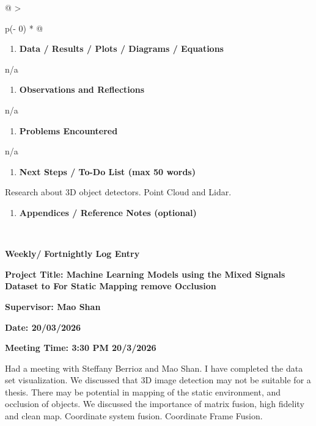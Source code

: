 \begin{longtable}[]{@{}
  >{\raggedright\arraybackslash}p{(\columnwidth - 0\tabcolsep) * }@{}}
\begin{minipage}[b]{\linewidth}
\begin{enumerate}
\def\labelenumi{\arabic{enumi}.}
\setcounter{enumi}{2}
\item
  \textbf{Data / Results / Plots / Diagrams / Equations}
\end{enumerate}

n/a

\begin{enumerate}
\def\labelenumi{\arabic{enumi}.}
\setcounter{enumi}{3}
\item
  \textbf{Observations and Reflections}
\end{enumerate}

n/a

\begin{enumerate}
\def\labelenumi{\arabic{enumi}.}
\setcounter{enumi}{4}
\item
  \textbf{Problems Encountered}
\end{enumerate}

n/a

\begin{enumerate}
\def\labelenumi{\arabic{enumi}.}
\setcounter{enumi}{5}
\item
  \textbf{Next Steps / To-Do List (max 50 words)}
\end{enumerate}

Research about 3D object detectors. Point Cloud and Lidar.

\begin{enumerate}
\def\labelenumi{\arabic{enumi}.}
\setcounter{enumi}{6}
\item
  \textbf{Appendices / Reference Notes (optional)}
\end{enumerate}
\end{minipage} \\
\midrule\noalign{}
\endhead
\bottomrule\noalign{}
\endlastfoot
\begin{minipage}[t]{\linewidth}\raggedright
\textbf{Weekly/} \textbf{Fortnightly Log Entry}

\textbf{Project Title: Machine Learning Models using the Mixed Signals
Dataset to For Static Mapping remove Occlusion}

\textbf{Supervisor: Mao Shan}

\textbf{Date: 20/03/2026}

\textbf{Meeting Time: 3:30 PM 20/3/2026}

Had a meeting with Steffany Berrioz and Mao Shan. I have completed the
data set visualization. We discussed that 3D image detection may not be
suitable for a thesis. There may be potential in mapping of the static
environment, and occlusion of objects. We discussed the importance of
matrix fusion, high fidelity and clean map. Coordinate system fusion.
Coordinate Frame Fusion.


\end{minipage}
\end{longtable}
